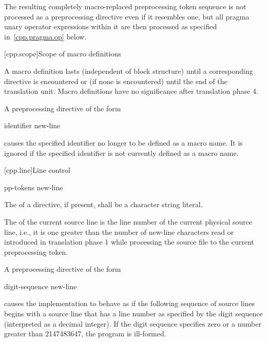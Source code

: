 \pnum
The resulting completely macro-replaced preprocessing token sequence
is not processed as a preprocessing directive even if it resembles one,
but all pragma unary operator expressions within it are then processed as
specified in~\ref{cpp.pragma.op} below.

[cpp.scope]{Scope of macro definitions}%
%

\pnum
A macro definition lasts
(independent of block structure)
until a corresponding
directive is encountered or
(if none is encountered)
until the end of the translation unit.
Macro definitions have no significance after translation phase 4.

\pnum
A preprocessing directive of the form
\begin{ncsimplebnf}
 identifier new-line
%
\end{ncsimplebnf}
causes the specified identifier no longer to be defined as a macro name.
It is ignored if the specified identifier is not currently defined as
a macro name.


[cpp.line]{Line control}%
%

\begin{bnf}
\br
     pp-tokens new-line
\end{bnf}

\pnum
The  of a
directive, if present,
shall be a character string literal.

\pnum
The
of the current source line is
the line number of the current physical source line,
i.e., it is one greater than
the number of new-line characters read or introduced
in translation phase 1
while processing the source file to the current preprocessing token.

\pnum
A preprocessing directive of the form
\begin{ncsimplebnf}
 digit-sequence new-line
\end{ncsimplebnf}
causes the implementation to behave as if
the following sequence of source lines begins with a
source line that has a line number as specified
by the digit sequence (interpreted as a decimal integer).
If the digit sequence specifies zero
or a number greater than 2147483647,
the program is ill-formed.

